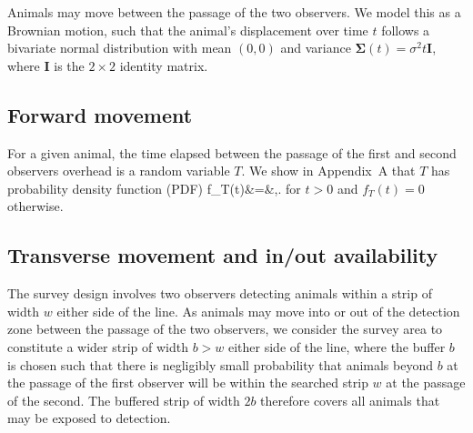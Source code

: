 \documentclass[useAMS, usenatbib, referee]{biom}\usepackage[]{graphicx}\usepackage[]{color}
\begin{document}
Animals may move between the passage of the two observers. We model this as a Brownian motion, such that the animal's displacement over time $t$ follows a bivariate normal distribution with mean $(0,0)$ and variance $\bm{\Sigma}(t)=\sigma^2t\bm{I}$, where $\bm{I}$ is the $2\times 2$ identity matrix.


\subsection{Forward movement}

For a given animal, the time elapsed between the passage of the first and second observers overhead is a random variable $T$. We show in Appendix~A that $T$ has probability density function (PDF)
\be
f_{T}(t)&=&,.
\label{eq:fTt}
\ee
\noindent 
for $t>0$ and $f_{T}(t)=0$ otherwise.




\subsection{Transverse movement and in/out availability}


The survey design involves two observers detecting animals within a strip of width $w$ either side of the line. As animals may move into or out of the detection zone between the passage of the two observers, we consider the survey area to constitute a wider strip of width $b>w$ either side of the line, where the buffer $b$ is chosen such that there is negligibly small probability that animals beyond $b$ at the passage of the first observer will be within the searched strip $w$ at the passage of the second. The buffered strip of width $2b$ therefore covers all animals that may be exposed to detection.
\end{document}
